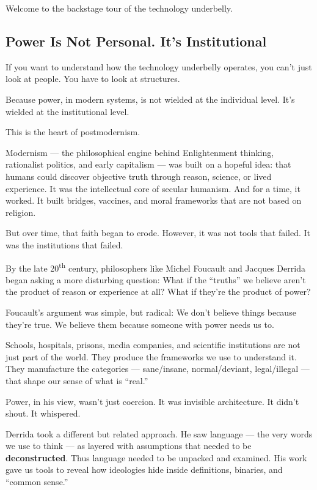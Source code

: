 Welcome to the backstage tour of the technology underbelly.


\subsection{Power Is Not Personal. It’s Institutional}

If you want to understand how the technology underbelly operates, you can’t just look at people.  
You have to look at structures.

Because power, in modern systems, is not wielded at the individual level.  
It’s wielded at the institutional level.

This is the heart of postmodernism.

Modernism — the philosophical engine behind Enlightenment thinking, rationalist politics, and early capitalism — was built 
on a hopeful idea:  
that humans could discover objective truth through reason, science, or lived experience.  
It was the intellectual core of secular humanism.  
And for a time, it worked. It built bridges, vaccines, and moral frameworks that are not based on religion.

But over time, that faith began to erode. However, it was not tools that failed. It was the institutions that failed.

By the late 20\textsuperscript{th} century, philosophers like Michel Foucault and Jacques Derrida began asking a more 
disturbing question:  
What if the “truths” we believe aren’t the product of reason or experience at all?  
What if they’re the product of power?

Foucault’s argument was simple, but radical:  
We don’t believe things because they’re true.  
We believe them because someone with power needs us to.

Schools, hospitals, prisons, media companies, and scientific institutions are not just part of the world.  
They produce the frameworks we use to understand it. They manufacture the categories --- sane/insane, normal/deviant, 
legal/illegal --- that shape our sense of what is “real.”

Power, in his view, wasn’t just coercion. It was invisible architecture.  
It didn’t shout. It whispered.

Derrida took a different but related approach.  
He saw language --- the very words we use to think --- as layered with assumptions that needed to be \textbf{deconstructed}.  
Thus language needed to be unpacked and examined.  
His work gave us tools to reveal how ideologies hide inside definitions, binaries, and ``common sense.''

